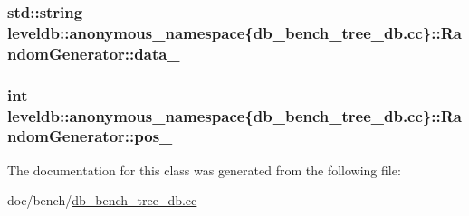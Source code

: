 \subsubsection[{data\+\_\+}]{\setlength{\rightskip}{0pt plus 5cm}std\+::string leveldb\+::anonymous\+\_\+namespace\{db\+\_\+bench\+\_\+tree\+\_\+db.\+cc\}\+::Random\+Generator\+::data\+\_\+\hspace{0.3cm}{\ttfamily [private]}}\label{classleveldb_1_1anonymous__namespace_02db__bench__tree__db_8cc_03_1_1_random_generator_aa415f92a9d394aa496c4db477736c044}
\hypertarget{classleveldb_1_1anonymous__namespace_02db__bench__tree__db_8cc_03_1_1_random_generator_a407f235e6c6156493398129b8ad1e1f4}{}
\subsubsection[{pos\+\_\+}]{\setlength{\rightskip}{0pt plus 5cm}int leveldb\+::anonymous\+\_\+namespace\{db\+\_\+bench\+\_\+tree\+\_\+db.\+cc\}\+::Random\+Generator\+::pos\+\_\+\hspace{0.3cm}{\ttfamily [private]}}\label{classleveldb_1_1anonymous__namespace_02db__bench__tree__db_8cc_03_1_1_random_generator_a407f235e6c6156493398129b8ad1e1f4}


The documentation for this class was generated from the following file\+:\begin{DoxyCompactItemize}
\item 
doc/bench/\hyperlink{db__bench__tree__db_8cc}{db\+\_\+bench\+\_\+tree\+\_\+db.\+cc}\end{DoxyCompactItemize}
